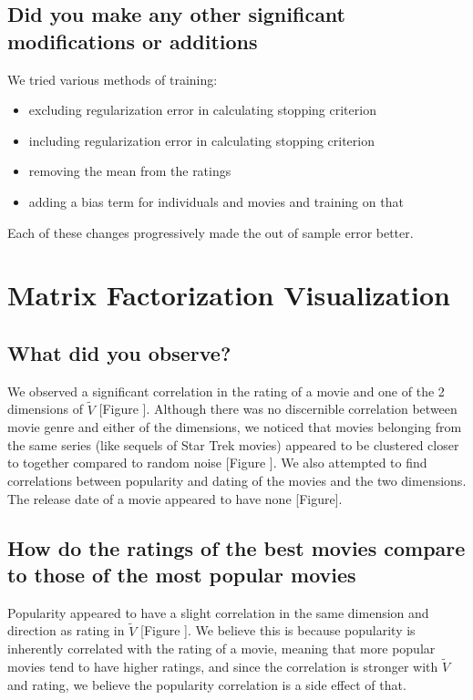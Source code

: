 \subsection*{Did you make any other significant modifications or additions}
We tried various methods of training:
\begin{itemize}
  \item excluding regularization error in calculating stopping criterion
  \item including regularization error in calculating stopping criterion
  \item removing the mean from the ratings
  \item adding a bias term for individuals and movies and training on that
\end{itemize}
Each of these changes progressively made the out of sample error better.

\section{Matrix Factorization Visualization}
\medskip
\subsection*{What did you observe?}
We observed a significant correlation in the rating of a movie and one of the 2 dimensions of $\widetilde{V}$ [Figure ]. Although there was no discernible correlation between movie genre and either of the dimensions, we noticed that movies belonging from the same series (like sequels of Star Trek movies) appeared to be clustered closer to together compared to random noise [Figure ]. We also attempted to find correlations between popularity and dating of the movies and the two dimensions. The release date of a movie appeared to have none [Figure]. 

\subsection*{How do the ratings of the best movies compare to those of the most popular movies}
Popularity appeared to have a slight correlation in the same dimension and direction as rating in $\widetilde{V}$ [Figure ]. We believe this is because popularity is inherently correlated with the rating of a movie, meaning that more popular movies tend to have higher ratings, and since the correlation is stronger with $\widetilde{V}$ and rating, we believe the popularity correlation is a side effect of that.

